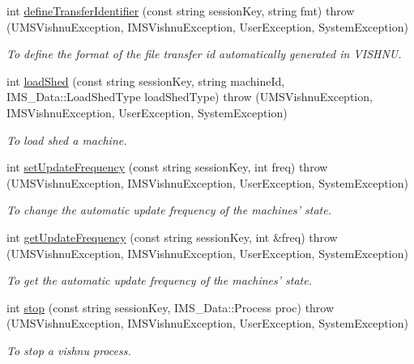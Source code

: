 \begin{DoxyCompactItemize}
int \hyperlink{namespacevishnu_adc1d08f000cf50058dd8b0688ea7fb1f}{defineTransferIdentifier} (const string sessionKey, string fmt)  throw (UMSVishnuException, IMSVishnuException, UserException, SystemException)
\begin{DoxyCompactList}\small\item\em To define the format of the file transfer id automatically generated in VISHNU. \item\end{DoxyCompactList}\item 
int \hyperlink{namespacevishnu_ab088d903ec32abcb3ad6f1d2336c04ac}{loadShed} (const string sessionKey, string machineId, IMS\_\-Data::LoadShedType loadShedType)  throw (UMSVishnuException, IMSVishnuException, UserException, SystemException)
\begin{DoxyCompactList}\small\item\em To load shed a machine. \item\end{DoxyCompactList}\item 
int \hyperlink{namespacevishnu_a860094ba973969b94110555d6bb3b557}{setUpdateFrequency} (const string sessionKey, int freq)  throw (UMSVishnuException, IMSVishnuException, UserException, SystemException)
\begin{DoxyCompactList}\small\item\em To change the automatic update frequency of the machines' state. \item\end{DoxyCompactList}\item 
int \hyperlink{namespacevishnu_a5b13b2b9e19299c652246a9533f92717}{getUpdateFrequency} (const string sessionKey, int \&freq)  throw (UMSVishnuException, IMSVishnuException, UserException, SystemException)
\begin{DoxyCompactList}\small\item\em To get the automatic update frequency of the machines' state. \item\end{DoxyCompactList}\item 
int \hyperlink{namespacevishnu_a0a5795c2a88415d758de3a05762850ce}{stop} (const string sessionKey, IMS\_\-Data::Process proc)  throw (UMSVishnuException, IMSVishnuException, UserException, SystemException)
\begin{DoxyCompactList}\small\item\em To stop a vishnu process. \item\end{DoxyCompactList}\item 

\end{DoxyCompactItemize}
